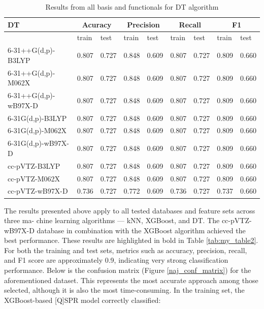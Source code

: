 \begin{table}[H]
\centering
\caption{Results from all basis and functionals for DT algorithm}
\begin{tabular}{|l |l |l |l |l |l |l |l |l|}\hline      
DT & \multicolumn{2}{|c|}{Acuracy} & \multicolumn{2}{|c|}{Precision} & \multicolumn{2}{|c|}{Recall} & \multicolumn{2}{|c|}{F1} \\\hline
 & train & test & train & test & train & test & train & test \\\hline
6-31++G(d,p)-B3LYP & 0.807 & 0.727 & 0.848 & 0.609 & 0.807 & 0.727 & 0.809 & 0.660 \\\hline
6-31++G(d,p)-M062X & 0.807 & 0.727 & 0.848 & 0.609 & 0.807 & 0.727 & 0.809 & 0.660 \\\hline
6-31++G(d,p)-wB97X-D & 0.807 & 0.727 & 0.848 & 0.609 & 0.807 & 0.727 & 0.809 & 0.660 \\\hline
6-31G(d,p)-B3LYP & 0.807 & 0.727 & 0.848 & 0.609 & 0.807 & 0.727 & 0.809 & 0.660 \\\hline
6-31G(d,p)-M062X & 0.807 & 0.727 & 0.848 & 0.609 & 0.807 & 0.727 & 0.809 & 0.660 \\\hline
6-31G(d,p)-wB97X-D & 0.807 & 0.727 & 0.848 & 0.609 & 0.807 & 0.727 & 0.809 & 0.660 \\\hline
cc-pVTZ-B3LYP & 0.807 & 0.727 & 0.848 & 0.609 & 0.807 & 0.727 & 0.809 & 0.660 \\\hline
cc-pVTZ-M062X & 0.807 & 0.727 & 0.848 & 0.609 & 0.807 & 0.727 & 0.809 & 0.660 \\\hline
cc-pVTZ-wB97X-D & 0.736 & 0.727 & 0.772 & 0.609 & 0.736 & 0.727 & 0.737 & 0.660 \\ \hline

\end{tabular}

\label{tab:my_table3}
\end{table}

The results presented above apply to all tested databases and feature sets across three ma- chine learning algorithms — kNN, XGBoost, and DT. The cc-pVTZ-wB97X-D database in combination with the XGBoost algorithm achieved the best performance. These results are highlighted in bold in Table \ref{tab:my_table2}. For both the training and test sets, metrics such as accuracy, precision, recall, and F1 score are approximately 0.9, indicating very strong classification performance. Below is the confusion matrix  (Figure \ref{naj_conf_matrix}) for the aforementioned dataset. This represents the most accurate approach among those selected, although it is also the most time-consuming. In the training set, the XGBoost-based [Q]SPR model correctly classified:

